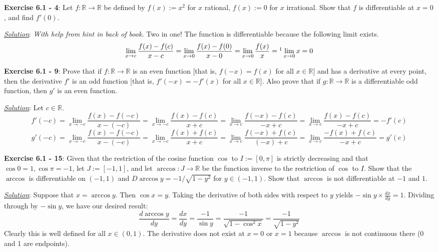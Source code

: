 \documentclass{article}
\begin{document}
\hrulefill

\textbf{Exercise 6.1 - 4}: Let $f:\mathbb R\to\mathbb R$ be defined by
$f(x):=x^2$ for $x$ rational, $f(x):=0$ for $x$ irrational. Show that $f$ is
differentiable at $x=0$, and find $f'(0)$.

\underline{\textit{Solution}}: \textit{With help from hint in back of book.}
Two in one! The function is differentiable because the following limit
exists.
\[
  \lim_{x\to c}\frac{f(x)-f(c)}{x-c}
  =\lim_{x\to0}\frac{f(x)-f(0)}{x-0}
  =\lim_{x\to0}\frac{f(x)}{x}
  =\footnote{Because $0\leq|f(x)/x|\leq|x|$ for all $x\in\mathbb R$}
  \lim_{x\to0}x
  =0
\]

\hrulefill

\textbf{Exercise 6.1 - 9}: Prove that if $f:\mathbb R\to\mathbb R$ is an
even function [that is, $f(-x)=f(x)$ for all $x\in\mathbb R$] and has a
derivative at every point, then the derivative $f'$ is an odd function
[that is, $f'(-x)=-f'(x)$ for all $x\in\mathbb{R}$]. Also prove that if
$g:\mathbb R\to\mathbb R$ is a differentiable odd function, then $g'$ is an
even function.

\underline{\textit{Solution}}: Let $c\in\mathbb{R}$.
\[
  f'(-c)
  =\lim_{x\to-c}\frac{f(x)-f(-c)}{x-(-c)}
  =\lim_{x\to-c}\frac{f(x)-f(c)}{x+c}
  =\lim_{x\to c}\frac{f(-x)-f(c)}{-x+c}
  =\lim_{x\to c}\frac{f(x)-f(c)}{-x+c}
  =-f'(c)
\]
\[
  g'(-c)
  =\lim_{x\to-c}\frac{f(x)-f(-c)}{x-(-c)}
  =\lim_{x\to-c}\frac{f(x)+f(c)}{x+c}
  =\lim_{x\to c}\frac{f(-x)+f(c)}{(-x)+c}
  =\lim_{x\to c}\frac{-f(x)+f(c)}{-x+c}
  =g'(c)
\]

\hrulefill

\textbf{Exercise 6.1 - 15}: Given that the restriction of the cosine
function $\cos$ to $I:=[0,\pi]$ is strictly decreasing and that
$\cos0=1,\cos\pi=-1$, let $J:=[-1,1]$, and let $\arccos: J\to\mathbb R$ be
the function inverse to the restriction of $\cos$ to $I$. Show that the
$\arccos$ is differentiable on $(-1,1)$ and $D \arccos y=-1/\sqrt{1-y^2}$
for $y\in(-1,1)$. Show that $\arccos$ is not differentiable at $-1$ and $1$.

\underline{\textit{Solution}}: Suppose that $x=\arccos y$. Then $\cos x=y$.
Taking the derivative of both sides with respect to $y$ yields
$-\sin y\times\frac{dx}{dy}=1$. Dividing through by $-\sin y$, we have our
desired result:
\[
  \frac{d\arccos y}{dy}
  =\frac{dx}{dy}=\frac{-1}{\sin y}
  =\frac{-1}{\sqrt{1-\cos^2x}}
  =\frac{-1}{\sqrt{1-y^2}}
\]
Clearly this is well defined for all $x\in(0,1)$. The derivative does not
exist at $x=0$ or $x=1$ because $\arccos$ is not continuous there (0 and
1 are endpoints).
\end{document}
